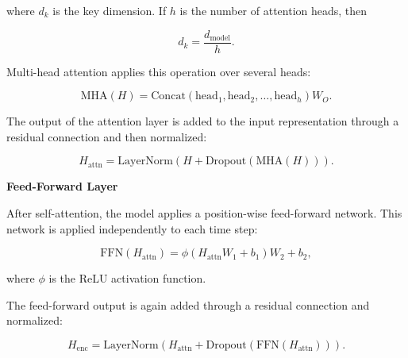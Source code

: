 \documentclass{book}
\providecommand{\ProjectDeepHeading}[2]{%
    \par\medskip\noindent\textbf{#2}\par\smallskip
}
\begin{document}
        where \(d_k\) is the key dimension. If \(h\) is the number of attention heads, then
        
        \[
            d_k
            =
            \frac{
                d_{\mathrm{model}}
            }{
                h
            }.
        \]
        
        Multi-head attention applies this operation over several heads:
        
        \[
            \mathrm{MHA}(H)
            =
            \mathrm{Concat}
            \left(
                \mathrm{head}_1,
                \mathrm{head}_2,
                \ldots,
                \mathrm{head}_h
            \right)
            W_O.
        \]
        
        The output of the attention layer is added to the input representation through a residual connection and then normalized:
        
        \[
            H_{\mathrm{attn}}
            =
            \mathrm{LayerNorm}
            \left(
                H
                +
                \mathrm{Dropout}
                \left(
                    \mathrm{MHA}(H)
                \right)
            \right).
        \]
    
    
    \ProjectDeepHeading{8}{Feed-Forward Layer}
        
        After self-attention, the model applies a position-wise feed-forward network. This network is applied independently to each time step:
        
        \[
            \mathrm{FFN}
            \left(
                H_{\mathrm{attn}}
            \right)
            =
            \ensuremath{\phi}
            \left(
                H_{\mathrm{attn}}W_1
            +
            b_1
            \right)
            W_2
            +
            b_2,
        \]
        
        where \(\ensuremath{\phi}\) is the ReLU activation function.
        
        The feed-forward output is again added through a residual connection and normalized:
        
        \[
            H_{\mathrm{enc}}
            =
            \mathrm{LayerNorm}
            \left(
                H_{\mathrm{attn}}
                +
                \mathrm{Dropout}
                \left(
                    \mathrm{FFN}
                    \left(
                        H_{\mathrm{attn}}
                    \right)
                \right)
            \right).
        \]
        
\end{document}
